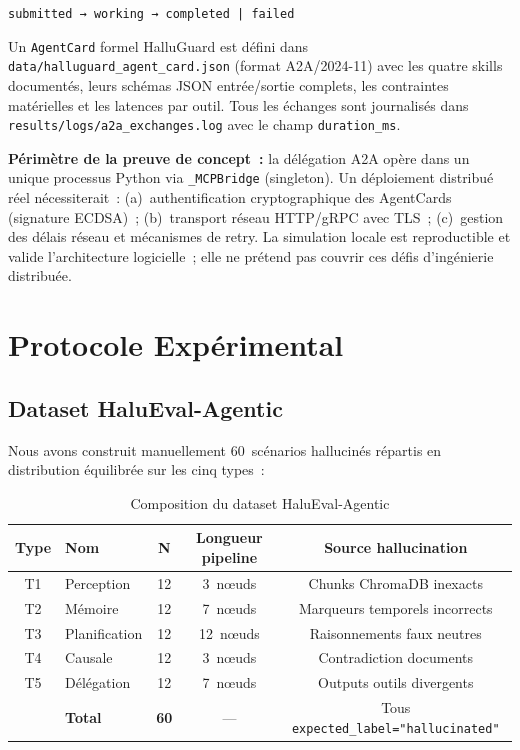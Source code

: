 \documentclass[12pt,a4paper]{article}
\begin{document}
\begin{center}
\texttt{submitted~→~working~→~completed~|~failed}
\end{center}

Un \texttt{AgentCard} formel HalluGuard est défini dans \texttt{data/halluguard\_agent\_card.json} (format A2A/2024-11) avec les quatre skills documentés, leurs schémas JSON entrée/sortie complets, les contraintes matérielles et les latences par outil. Tous les échanges sont journalisés dans \texttt{results/logs/a2a\_exchanges.log} avec le champ \texttt{duration\_ms}.

\textbf{Périmètre de la preuve de concept~:} la délégation A2A opère dans un unique processus Python via \texttt{\_MCPBridge} (singleton). Un déploiement distribué réel nécessiterait~: (a)~authentification cryptographique des AgentCards (signature ECDSA)~; (b)~transport réseau HTTP/gRPC avec TLS~; (c)~gestion des délais réseau et mécanismes de retry. La simulation locale est reproductible et valide l'architecture logicielle~; elle ne prétend pas couvrir ces défis d'ingénierie distribuée.

\section{Protocole Expérimental}

\subsection{Dataset HaluEval-Agentic}
\label{sec:protocol}

Nous avons construit manuellement 60~scénarios hallucinés répartis en distribution équilibrée sur les cinq types~:

\begin{table}[H]
\centering
\caption{Composition du dataset HaluEval-Agentic}
\label{tab:dataset}
\begin{tabular}{clccc}
\toprule
\textbf{Type} & \textbf{Nom} & \textbf{N} & \textbf{Longueur pipeline} & \textbf{Source hallucination} \\
\midrule
T1 & Perception     & 12 & 3~nœuds  & Chunks ChromaDB inexacts \\
T2 & Mémoire        & 12 & 7~nœuds  & Marqueurs temporels incorrects \\
T3 & Planification  & 12 & 12~nœuds & Raisonnements faux neutres \\
T4 & Causale        & 12 & 3~nœuds  & Contradiction documents \\
T5 & Délégation     & 12 & 7~nœuds  & Outputs outils divergents \\
\midrule
   & \textbf{Total} & \textbf{60} & --- & Tous \texttt{expected\_label="hallucinated"} \\
\bottomrule
\end{tabular}
\end{table}
\end{document}
